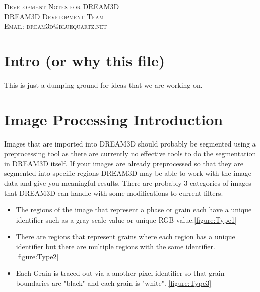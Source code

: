 \documentclass[12pt]{article} %
\begin{document}
\begin{center}
\textsc{\huge Development Notes for DREAM3D}\\[1.5cm]
\textsc{\large DREAM3D Development Team\\
Email: dream3d@bluequartz.net}\\[1.5cm]
\end{center}

{}
\section{Intro (or why this file)}
  This is just a dumping ground for ideas that we are working on.

\section{Image Processing Introduction}


Images that are imported into DREAM3D should probably be segmented using a preprocessing tool as there are currently no effective tools to do the segmentation in DREAM3D itself. If your images are already preprocessed so that they are segmented into specific regions DREAM3D may be able to work with the image data and give you meaningful results. There are probably 3 categories of images that DREAM3D can handle with some modifications to current filters.


\begin{itemize}
\item The regions of the image that represent a phase or grain each have a unique identifier such as a gray scale value or unique RGB value.\ref{figure:Type1}
\item There are regions that represent grains where each region has a unique identifier but there are multiple regions with the same identifier. \ref{figure:Type2}
\item Each Grain is traced out via a another pixel identifier so that grain boundaries are "black" and each grain is "white". \ref{figure:Type3}
\end{itemize}
\end{document}
